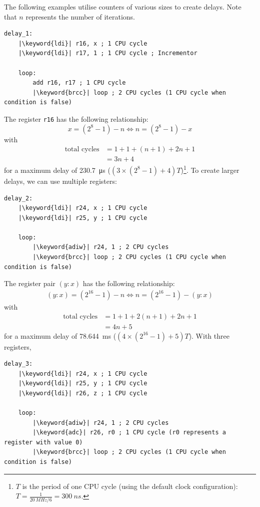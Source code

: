 \documentclass[a4paper]{report}
\newcommand{\keyword}[1]{\textcolor[rgb]{0.00,0.50,0.00}{\textbf{#1}}}
\begin{document}
The following examples utilise counters of various sizes to create delays.
Note that \(n\) represents the number of iterations.
\begin{verbatim}
delay_1:
    |\keyword{ldi}| r16, x ; 1 CPU cycle
    |\keyword{ldi}| r17, 1 ; 1 CPU cycle ; Incrementor

    loop:
        add r16, r17 ; 1 CPU cycle
        |\keyword{brcc}| loop ; 2 CPU cycles (1 CPU cycle when condition is false)
\end{verbatim}
The register \texttt{r16} has the following relationship:
\begin{equation*}
    x = \left( 2^8 - 1 \right) - n \iff n = \left( 2^8 - 1 \right) - x
\end{equation*}
with
\begin{align*}
    \text{total cycles} & = 1 + 1 + \left( n + 1 \right) + 2 n + 1 \\
                        & = 3 n + 4
\end{align*}
for a maximum delay of \qty{230.7}{\micro s} (\(\left( 3 \times \left( 2^8 - 1 \right) + 4 \right) T\))\footnote{\(T\) is the period of one CPU cycle (using the default clock configuration): \(T = \frac{1}{\qty{20}{MHz} / 6} = \qty{300}{ns}\).}.
To create larger delays, we can use multiple registers:
\begin{verbatim}
delay_2:
    |\keyword{ldi}| r24, x ; 1 CPU cycle
    |\keyword{ldi}| r25, y ; 1 CPU cycle

    loop:
        |\keyword{adiw}| r24, 1 ; 2 CPU cycles
        |\keyword{brcc}| loop ; 2 CPU cycles (1 CPU cycle when condition is false)
\end{verbatim}
The register pair \(\left( y:x \right)\) has the following relationship:
\begin{align*}
    \left( y:x \right) = \left( 2^{16} - 1 \right) - n \iff n = \left( 2^{16} - 1 \right) - \left( y:x \right)
\end{align*}
with
\begin{align*}
    \text{total cycles} & = 1 + 1 + 2 \left( n + 1 \right) + 2 n + 1 \\
                        & = 4n + 5
\end{align*}
for a maximum delay of \qty{78.644}{ms} (\(\left(4 \times \left( 2^{16} - 1 \right) + 5 \right) T\)).
With three registers,
\begin{verbatim}
delay_3:
    |\keyword{ldi}| r24, x ; 1 CPU cycle
    |\keyword{ldi}| r25, y ; 1 CPU cycle
    |\keyword{ldi}| r26, z ; 1 CPU cycle

    loop:
        |\keyword{adiw}| r24, 1 ; 2 CPU cycles
        |\keyword{adc}| r26, r0 ; 1 CPU cycle (r0 represents a register with value 0)
        |\keyword{brcc}| loop ; 2 CPU cycles (1 CPU cycle when condition is false)
\end{verbatim}
\end{document}
